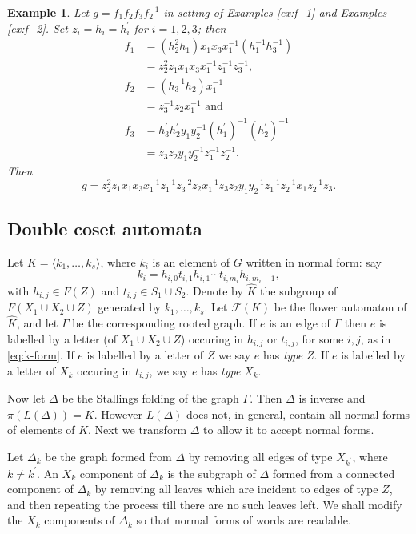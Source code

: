 \documentclass[a4paper,12pt]{article}
\newcommand{\G}{\Gamma }
\newcommand{\D}{\Delta }
\newcommand{\cF}{{\cal{F}}}
\newtheorem{exam}[theorem]{Example}
\newenvironment{example}{\begin{exam} \rm}{\end{exam}}
\numberwithin{equation}{section}
\numberwithin{figure}{section}
\renewcommand{\cF}{\mathcal{F}}
\newcommand{\la}{\langle}
\newcommand{\ra}{\rangle}
\begin{document}
\begin{example}\label{ex:g}
Let $g =f_1 f_2 f_3 f_2^{-1}$ in setting  of Examples \ref{ex:f_1} and 
Examples \ref{ex:f_2}.
Set $z_i = h_i = h_i^{\prime}$ for $i= 1,2,3$; then
\begin{align*}
f_1&=(h_2^{2}h_1) x_1x_3x_1^{-1} (h_1^{-1}h_3^{-1})\\
&=z_2^2z_1  x_1x_3x_1^{-1}z_1^{-1}z_3^{-1},\\
f_2&=(h_3^{-1}h_2) x_1^{-1}\\
&=z_3^{-1}z_2 x_1^{-1}\textrm{ and }\\
f_3&=h^\prime_3h_2^\prime y_1y_2^{-1} (h_1^\prime)^{-1}(h_2^\prime)^{-1}\\
&= z_3z_2 y_1y_2^{-1} z_1^{-1}z_2^{-1}.
\end{align*}
Then 
\[g=z_2^2 z_1  x_1 x_3 x_1^{-1} z_1^{-1} z_3^{-2}
z_2 x_1^{-1} 
z_3z_2 y_1y_2^{-1} z_1^{-1}z_2^{-1}
x_1z_2^{-1}z_3.
\]
\end{example}



\subsection{Double coset automata}
%
%
Let $K=\la k_1, \ldots , k_s\ra$, where $k_i$ is an element of $G$
written in normal form: say
\begin{equation}\label{eq:k-form}
k_i= h_{i,0}t_{i,1}h_{i,1}\cdots t_{i,m_i}h_{i,m_i+1},
\end{equation}
with $h_{i,j}\in F(Z)$ and $t_{i,j}\in S_1\cup S_2$. Denote
by $\hat K$ the subgroup of  $F(X_1\cup X_2 \cup Z)$ generated by
$k_1, \ldots , k_s$. 
Let $\cF(K)$ be the flower automaton of $\hat K$, and let
$\G$ be the corresponding rooted graph. If $e$ is an edge of $\G$ then
$e$ is labelled by a letter (of $X_1\cup X_2 \cup Z$)
occuring in $h_{i,j}$ or $t_{i,j}$, for some $i,j$, as in
\eqref{eq:k-form}. If $e$ is labelled by a letter of $Z$ we say $e$ has {\em type} $Z$.
If $e$ is labelled by a letter of $X_k$ occuring in
$t_{i,j}$, we say $e$ has {\em type} $X_k$.

Now let $\D$ be the Stallings folding of the graph $\G$.  Then
 $\D$ is inverse and $\pi(L(\D))=K$. However
$L(\D)$ does not, in general, contain all normal forms of elements of $K$.
Next we transform $\D$ to allow it to accept normal forms.


Let $\D_k$ be the graph formed from $\D$ by removing all edges of
type $X_{k^\prime}$, where $k\neq k^\prime$. An $X_k$ component of
$\D_k$ is the subgraph of $\D$ formed from a connected component
of $\D_k$ by removing all leaves which are incident to edges of
type $Z$, and then repeating the process till there are no such
leaves left.
 We shall modify the $X_k$ components of $\D_k$ so that normal forms of words
are readable.
\end{document}
